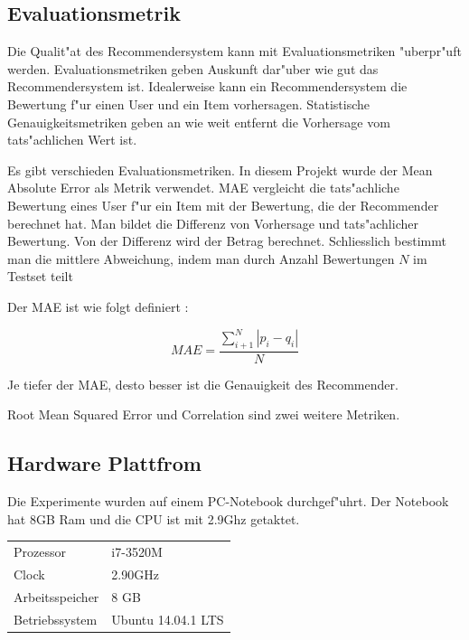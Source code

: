 \documentclass[a4paper, 12pt]{article}
\begin{document}
\subsection{Evaluationsmetrik}
\label{sec:evaluationmetrik}

Die Qualit"at des Recommendersystem kann mit Evaluationsmetriken "uberpr"uft werden. Evaluationsmetriken geben Auskunft dar"uber wie gut das Recommendersystem ist. Idealerweise kann ein Recommendersystem die Bewertung f"ur einen User und ein Item vorhersagen. Statistische Genauigkeitsmetriken geben an wie weit entfernt die Vorhersage vom tats"achlichen Wert ist. 

Es gibt verschieden Evaluationsmetriken. In diesem Projekt wurde der Mean Absolute Error als Metrik verwendet. MAE vergleicht die tats"achliche Bewertung eines User f"ur ein Item mit der Bewertung, die der Recommender berechnet hat. Man bildet die Differenz von Vorhersage und tats"achlicher Bewertung. Von der Differenz wird der Betrag berechnet. Schliesslich bestimmt man die mittlere Abweichung, indem man durch Anzahl Bewertungen $N$ im Testset teilt 

Der MAE ist wie folgt definiert \cite{sarwar01}:

\begin{equation}
  \label{eq:mae}
  MAE = \frac{\sum_{i+1}^N | p_i-q_i | }{N}
\end{equation}

Je tiefer der MAE, desto besser ist die Genauigkeit des Recommender.

Root Mean Squared Error und Correlation sind zwei weitere Metriken.

\subsection{Hardware Plattfrom}
\label{platform}

Die Experimente wurden auf einem PC-Notebook durchgef"uhrt. Der Notebook hat 8GB Ram und die CPU ist mit 2.9Ghz getaktet.

\begin{center}
\begin{tabular}{ll}
 Prozessor        &  i7-3520M            \\
 Clock            &  2.90GHz             \\
 Arbeitsspeicher  &  8 GB                \\
 Betriebssystem   &  Ubuntu 14.04.1 LTS  \\
\end{tabular}
\end{center}
\end{document}
